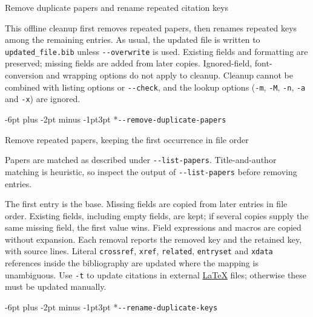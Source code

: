 \documentclass{amsart}
\makeatletter
\newcommand{\BibUpdateOptionHeading}{\@startsection{paragraph}{4}{0pt}
  {-6pt plus -2pt minus -1pt}{3pt}
  {\normalfont\bfseries\color{NavyBlue}}}
\newenvironment{BibUpdateOptionDescription}
  {\begin{list}{}{\setlength{\leftmargin}{2em}\setlength{\rightmargin}{0pt}%
    \setlength{\listparindent}{0pt}%
    \setlength{\topsep}{0pt}\setlength{\parsep}{4pt plus 1pt}%
    \setlength{\itemsep}{0pt}}\item\relax}
  {\end{list}}
\makeatother
\begin{document}
\begin{BibUpdateOptionDescription}

Remove duplicate papers and rename repeated citation keys

This offline cleanup first removes repeated papers, then renames
repeated keys among the remaining entries. As usual, the updated file is
written to \texttt{updated\_file.bib} unless \texttt{-\/-overwrite} is
used. Existing fields and formatting are preserved; missing fields are
added from later copies. Ignored-field, font-conversion and wrapping
options do not apply to cleanup. Cleanup cannot be combined with listing
options or \texttt{-\/-check}, and the lookup options (\texttt{-m},
\texttt{-M}, \texttt{-n}, \texttt{-a} and \texttt{-x}) are ignored.

\end{BibUpdateOptionDescription}

\BibUpdateOptionHeading*{\texorpdfstring{\texttt{-\/-remove-duplicate-papers}}{-\/-remove-duplicate-papers}}\label{--remove-duplicate-papers}

\begin{BibUpdateOptionDescription}

Remove repeated papers, keeping the first occurrence in file order

Papers are matched as described under \texttt{-\/-list-papers}.
Title-and-author matching is heuristic, so inspect the output of
\texttt{-\/-list-papers} before removing entries.

The first entry is the base. Missing fields are copied from later
entries in file order. Existing fields, including empty fields, are
kept; if several copies supply the same missing field, the first value
wins. Field expressions and macros are copied without expansion. Each
removal reports the removed key and the retained key, with source lines.
Literal \texttt{crossref}, \texttt{xref}, \texttt{related},
\texttt{entryset} and \texttt{xdata} references inside the bibliography
are updated where the mapping is unambiguous. Use \texttt{-t} to update
citations in external \href{https://latex-project.org/}{LaTeX} files;
otherwise these must be updated manually.

\end{BibUpdateOptionDescription}

\BibUpdateOptionHeading*{\texorpdfstring{\texttt{-\/-rename-duplicate-keys}}{-\/-rename-duplicate-keys}}\label{--rename-duplicate-keys}
\end{document}
